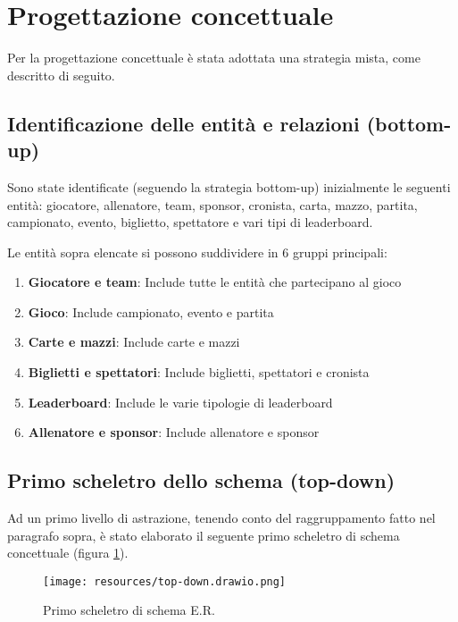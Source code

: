 \documentclass{article}
\begin{document}
\section{Progettazione concettuale}

Per la progettazione concettuale è stata adottata una strategia mista, come descritto di seguito.

\subsection{Identificazione delle entità e relazioni (bottom-up)}

Sono state identificate (seguendo la strategia bottom-up) inizialmente le seguenti entità: giocatore, allenatore, team, sponsor, cronista, carta, mazzo, partita, campionato, evento, biglietto, spettatore e vari tipi di leaderboard.

Le entità sopra elencate si possono suddividere in 6 gruppi principali:
\begin{enumerate}
    \item \textbf{Giocatore e team}: Include tutte le entità che partecipano al gioco
    \item \textbf{Gioco}: Include campionato, evento e partita
    \item \textbf{Carte e mazzi}: Include carte e mazzi
    \item \textbf{Biglietti e spettatori}: Include biglietti, spettatori e cronista
    \item \textbf{Leaderboard}: Include le varie tipologie di leaderboard
    \item \textbf{Allenatore e sponsor}: Include allenatore e sponsor
\end{enumerate}

\subsection{Primo scheletro dello schema (top-down)}

Ad un primo livello di astrazione, tenendo conto del raggruppamento fatto nel paragrafo sopra, è stato elaborato il seguente primo scheletro di schema concettuale (figura \ref{fig_primo_scheletro_ER}).

\begin{figure}[H]
    \centering
    \texttt{[image: resources/top-down.drawio.png]}
    \caption{Primo scheletro di schema E.R.}
    \label{fig_primo_scheletro_ER}
\end{figure}
\end{document}
